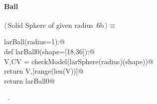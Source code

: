\documentclass[11pt,oneside]{article}	%
\begin{document}
\paragraph{Ball}
\begin{flushleft} \small \label{scrap13}
\protect{}$\langle\,$Solid Sphere of given radius\nobreak\ {\footnotesize 6b}$\,\rangle\equiv$
\vspace{-1ex}
\begin{list}{}{} \item
\mbox{}\verb@def larBall(radius=1):@\\
\mbox{}\verb@   def larBall0(shape=[18,36]):@\\
\mbox{}\verb@      V,CV = checkModel(larSphere(radius)(shape))@\\
\mbox{}\verb@      return V,[range(len(V))]@\\
\mbox{}\verb@   return larBall0@\\
\mbox{}\verb@@{\NWsep}
\end{list}
\vspace{-1ex}
\footnotesize\addtolength{\baselineskip}{-1ex}
\begin{list}{}{\setlength{\itemsep}{-\parsep}\setlength{\itemindent}{-\leftmargin}}
\item \NWtxtMacroRefIn\ .
\end{list}
\end{flushleft}
\end{document}
